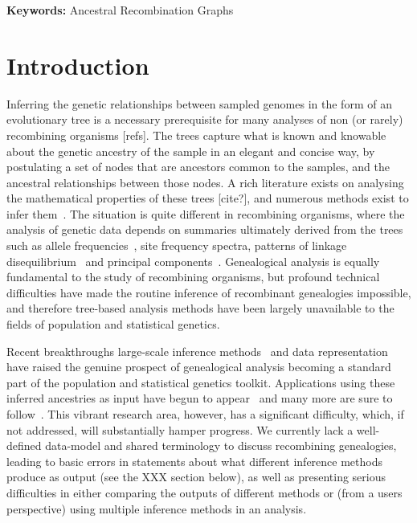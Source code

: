 \documentclass{article}
\begin{document}
\textbf{Keywords:} Ancestral Recombination Graphs

\section*{Introduction}
Inferring the genetic relationships between sampled genomes in the form of an
evolutionary tree is a necessary prerequisite for many analyses of non (or
rarely) recombining organisms [refs]. The trees capture what is known and
knowable about the genetic ancestry of the sample in an elegant and concise
way, by postulating a set of nodes that are ancestors common to the samples,
and the ancestral relationships between those nodes. A rich literature exists
on analysing the mathematical properties of these trees [cite?], and numerous
methods exist to infer them~\citep{felsenstein2004inferring}. The situation is
quite different in recombining organisms, where the analysis of genetic data
depends on summaries ultimately derived from the trees such as allele
frequencies~\citep{ralph2020efficiently}, site frequency spectra, patterns of linkage
disequilibrium~\citep{mcvean2002genealogical} and principal
components~\citep{mcvean2009genealogical}. Genealogical analysis is equally
fundamental to the study of recombining organisms, but profound technical
difficulties have made the routine inference of recombinant genealogies
impossible, and therefore tree-based analysis methods have been largely
unavailable to the fields of population and statistical genetics.

Recent breakthroughs large-scale inference
methods~\citep{rasmussen2014genome,kelleher2019inferring,speidel2019method,
schaefer2021ancestral,wohns2021unified}
and data representation~\citep{kelleher2016efficient}
have raised the genuine prospect of genealogical analysis becoming a standard part
of the population and statistical genetics toolkit.
Applications using these inferred ancestries as input have
begun to appear~\citep{osmond2021estimating} and many more are sure to
follow~\citep{harris2019database}. This vibrant research area, however,
has a significant difficulty, which, if not addressed, will substantially hamper
progress. We currently lack a well-defined data-model and shared terminology
to discuss recombining genealogies,
leading to basic errors in statements about what different inference methods
produce as output (see the XXX section below), as well as presenting serious
difficulties in either comparing the outputs of different methods or
(from a users perspective) using multiple inference methods in an analysis.
\end{document}
